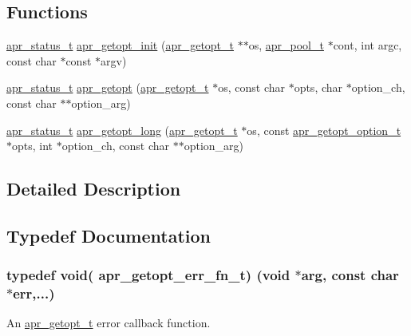 \subsection*{Functions}
\begin{DoxyCompactItemize}
\item 
\hyperlink{group__apr__errno_gaf76ee4543247e9fb3f3546203e590a6c}{apr\+\_\+status\+\_\+t} \hyperlink{group__apr__getopt_gaaab2b4bfb62361af7a2d427f5f29a3d4}{apr\+\_\+getopt\+\_\+init} (\hyperlink{structapr__getopt__t}{apr\+\_\+getopt\+\_\+t} $\ast$$\ast$os, \hyperlink{group__apr__pools_gaf137f28edcf9a086cd6bc36c20d7cdfb}{apr\+\_\+pool\+\_\+t} $\ast$cont, int argc, const char $\ast$const $\ast$argv)
\item 
\hyperlink{group__apr__errno_gaf76ee4543247e9fb3f3546203e590a6c}{apr\+\_\+status\+\_\+t} \hyperlink{group__apr__getopt_ga289cdcf7eacc997eb91fea7c02d08934}{apr\+\_\+getopt} (\hyperlink{structapr__getopt__t}{apr\+\_\+getopt\+\_\+t} $\ast$os, const char $\ast$opts, char $\ast$option\+\_\+ch, const char $\ast$$\ast$option\+\_\+arg)
\item 
\hyperlink{group__apr__errno_gaf76ee4543247e9fb3f3546203e590a6c}{apr\+\_\+status\+\_\+t} \hyperlink{group__apr__getopt_ga80d6ff2213da4e25406b3f179fa13989}{apr\+\_\+getopt\+\_\+long} (\hyperlink{structapr__getopt__t}{apr\+\_\+getopt\+\_\+t} $\ast$os, const \hyperlink{structapr__getopt__option__t}{apr\+\_\+getopt\+\_\+option\+\_\+t} $\ast$opts, int $\ast$option\+\_\+ch, const char $\ast$$\ast$option\+\_\+arg)
\end{DoxyCompactItemize}


\subsection{Detailed Description}


\subsection{Typedef Documentation}
\subsubsection[{\texorpdfstring{apr\+\_\+getopt\+\_\+err\+\_\+fn\+\_\+t}{apr_getopt_err_fn_t}}]{\setlength{\rightskip}{0pt plus 5cm}typedef void( apr\+\_\+getopt\+\_\+err\+\_\+fn\+\_\+t) (void $\ast$arg, const char $\ast$err,...)}\hypertarget{group__apr__getopt_ga67c949e3d93e50e12347acd92a3bbe18}{}\label{group__apr__getopt_ga67c949e3d93e50e12347acd92a3bbe18}
An {\ttfamily \hyperlink{structapr__getopt__t}{apr\+\_\+getopt\+\_\+t}} error callback function.

